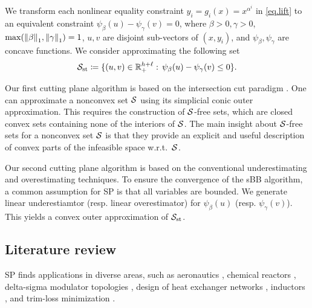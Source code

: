  We transform each nonlinear equality constraint $y_i = g_i(x) = x^{\alpha^i}$ in \eqref{eq.lift} to an equivalent constraint $ \psi_{\beta}(u) - \psi_{\gamma}(v) = 0$, where $\beta > 0, \gamma>0$, $\max({\lVert\beta\rVert}_1, {\lVert\gamma\rVert}_1)=1$, $u,v$ are disjoint sub-vectors of $(x,y_i)$, and $ \psi_{\beta} , \psi_{\gamma} $ are concave functions. We consider approximating the following set
\begin{equation}
\label{eq.sform}
	\mathcal S_{\mathrm{st}}\coloneqq\{(u, v) \in \mathbb R_{+}^{h + \ell}:\, \psi_{\beta}(u) - \psi_{\gamma}(v) \le 0\}.
\end{equation}

Our first cutting plane  algorithm is based on the intersection cut paradigm \cite{conforti2011}. One can approximate  a nonconvex set $\mathcal S$ using its simplicial conic outer approximation. This requires the construction of $\mathcal S$-free sets, which are closed convex sets containing none of the interiors of $\mathcal S$. The main insight about $\mathcal S$-free sets for a nonconvex set $\mathcal S$ is that they provide an explicit and useful description of convex parts of the infeasible space w.r.t.~$\mathcal S$.  

Our second cutting plane algorithm is based on the conventional underestimating and overestimating techniques.  To ensure the convergence of the sBB algorithm, a common assumption for SP is that all variables are bounded. We generate linear underestiamtor (resp. linear overestimator) for $\psi_{\beta}(u)$ (resp. $\psi_{\gamma}(v)$). This yields a convex outer approximation of $\mathcal S_{\mathrm{st}}$.


\subsection{Literature review}
 SP finds applications in diverse areas, such as aeronautics \cite{Opgenoord2017},  chemical reactors \cite{Blau1971}, delta-sigma modulator topologies \cite{Harjunkoski1998}, design of heat exchanger networks \cite{Bjork2002}, inductors \cite{Jabr2007}, and trim-loss minimization \cite{Harjunkoski1998}.   

